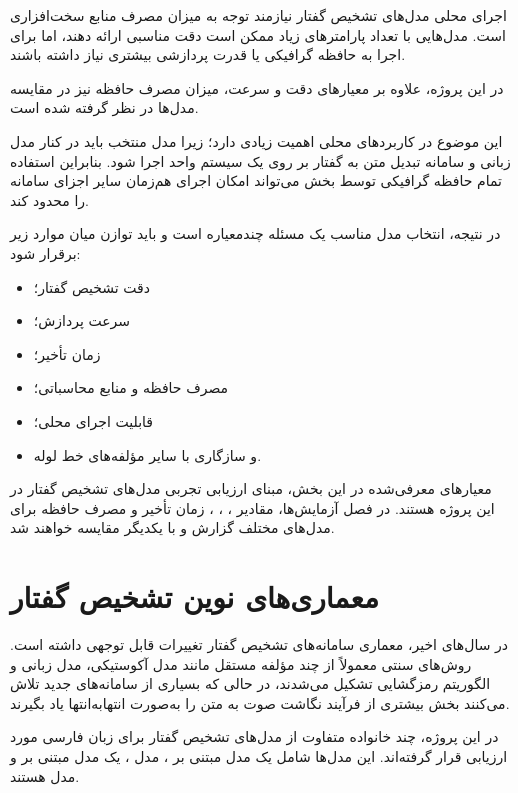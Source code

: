 اجرای محلی مدل‌های تشخیص گفتار نیازمند توجه به میزان مصرف
منابع سخت‌افزاری است.
مدل‌هایی با تعداد پارامترهای زیاد ممکن است دقت مناسبی ارائه دهند،
اما برای اجرا به حافظه گرافیکی یا قدرت پردازشی بیشتری نیاز
داشته باشند.

در این پروژه، علاوه بر معیارهای دقت و سرعت،
میزان مصرف حافظه
نیز در مقایسه مدل‌ها در نظر گرفته شده است.

این موضوع در کاربردهای محلی اهمیت زیادی دارد؛ زیرا مدل منتخب
باید در کنار مدل زبانی و سامانه تبدیل متن به گفتار بر روی
یک سیستم واحد اجرا شود.
بنابراین استفاده تمام حافظه گرافیکی توسط بخش  می‌تواند
امکان اجرای هم‌زمان سایر اجزای سامانه را محدود کند.

در نتیجه، انتخاب مدل مناسب یک مسئله چندمعیاره است و باید
توازن میان موارد زیر برقرار شود:

\begin{itemize}
    \item دقت تشخیص گفتار؛
    \item سرعت پردازش؛
    \item زمان تأخیر؛
    \item مصرف حافظه و منابع محاسباتی؛
    \item قابلیت اجرای محلی؛
    \item و سازگاری با سایر مؤلفه‌های خط لوله.
\end{itemize}

معیارهای معرفی‌شده در این بخش، مبنای ارزیابی تجربی مدل‌های
تشخیص گفتار در این پروژه هستند.
در فصل آزمایش‌ها، مقادیر ، ، ،
زمان تأخیر و مصرف حافظه برای مدل‌های مختلف گزارش و با یکدیگر
مقایسه خواهند شد.
\section{معماری‌های نوین تشخیص گفتار}

در سال‌های اخیر، معماری سامانه‌های تشخیص گفتار تغییرات
قابل توجهی داشته است.
روش‌های سنتی معمولاً از چند مؤلفه مستقل مانند مدل آکوستیکی،
مدل زبانی و الگوریتم رمزگشایی تشکیل می‌شدند، در حالی که
بسیاری از سامانه‌های جدید تلاش می‌کنند بخش بیشتری از فرآیند
نگاشت صوت به متن را به‌صورت انتهابه‌انتها یاد بگیرند.

در این پروژه، چند خانواده متفاوت از مدل‌های تشخیص گفتار
برای زبان فارسی مورد ارزیابی قرار گرفته‌اند.
این مدل‌ها شامل یک مدل مبتنی بر
،
مدل ،
یک مدل مبتنی بر 
و مدل
هستند.

